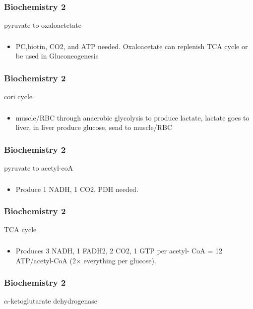 \documentclass[11pt]{beamer}
\begin{document}
\begin{frame}
 \frametitle{Biochemistry 2}
pyruvate to oxaloactetate 
\end{frame}

\begin{frame}
 \frametitle{}
\begin{itemize}
\item PC,biotin, CO2, and ATP needed. Oxaloacetate can replenish
TCA cycle or be used in
Gluconeogenesis
\end{itemize}
\end{frame}

\begin{frame}
 \frametitle{Biochemistry 2}
cori cycle 
\end{frame}

\begin{frame}
 \frametitle{}
\begin{itemize}
\item muscle/RBC through anaerobic glycolysis to produce lactate, lactate goes to liver, in liver produce glucose, send to muscle/RBC 
\end{itemize}
\end{frame}

\begin{frame}
 \frametitle{Biochemistry 2}
pyruvate to acetyl-coA
\end{frame}

\begin{frame}
 \frametitle{}
\begin{itemize}
\item Produce 1 NADH, 1 CO2. PDH needed. 
\end{itemize}
\end{frame}

\begin{frame}
 \frametitle{Biochemistry 2}
TCA cycle 
\end{frame}

\begin{frame}
 \frametitle{}
\begin{itemize}
\item Produces 3 NADH, 1 FADH2, 2 CO2, 1 GTP per acetyl- CoA = 12 ATP/acetyl-CoA (2${\times}$ everything per glucose).
\end{itemize}
\end{frame}

\begin{frame}
 \frametitle{Biochemistry 2}
${\alpha}$-ketoglutarate dehydrogenase
\end{frame}
\end{document}
